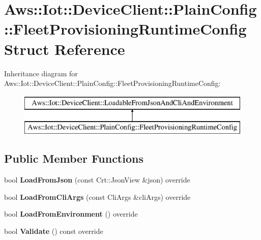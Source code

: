 \hypertarget{struct_aws_1_1_iot_1_1_device_client_1_1_plain_config_1_1_fleet_provisioning_runtime_config}{}\section{Aws\+:\+:Iot\+:\+:Device\+Client\+:\+:Plain\+Config\+:\+:Fleet\+Provisioning\+Runtime\+Config Struct Reference}
\label{struct_aws_1_1_iot_1_1_device_client_1_1_plain_config_1_1_fleet_provisioning_runtime_config}
Inheritance diagram for Aws\+:\+:Iot\+:\+:Device\+Client\+:\+:Plain\+Config\+:\+:Fleet\+Provisioning\+Runtime\+Config\+:\begin{figure}[H]
\begin{center}
\leavevmode
\includegraphics[height=2.000000cm]{struct_aws_1_1_iot_1_1_device_client_1_1_plain_config_1_1_fleet_provisioning_runtime_config}
\end{center}
\end{figure}
\subsection*{Public Member Functions}
\begin{DoxyCompactItemize}
\item 
\mbox{\label{struct_aws_1_1_iot_1_1_device_client_1_1_plain_config_1_1_fleet_provisioning_runtime_config_a12642dac957ddf8cc299248af3fffaf7}} 
bool {\bfseries Load\+From\+Json} (const Crt\+::\+Json\+View \&json) override
\item 
\mbox{\label{struct_aws_1_1_iot_1_1_device_client_1_1_plain_config_1_1_fleet_provisioning_runtime_config_a17ed50833febbd764efbc961f21ae95a}} 
bool {\bfseries Load\+From\+Cli\+Args} (const Cli\+Args \&cli\+Args) override
\item 
\mbox{\label{struct_aws_1_1_iot_1_1_device_client_1_1_plain_config_1_1_fleet_provisioning_runtime_config_a59e7de2571c11de4b0d34eed2fa41658}} 
bool {\bfseries Load\+From\+Environment} () override
\item 
\mbox{\label{struct_aws_1_1_iot_1_1_device_client_1_1_plain_config_1_1_fleet_provisioning_runtime_config_a052642641fb1331492d918b9f715252d}} 
bool {\bfseries Validate} () const override
\end{DoxyCompactItemize}
